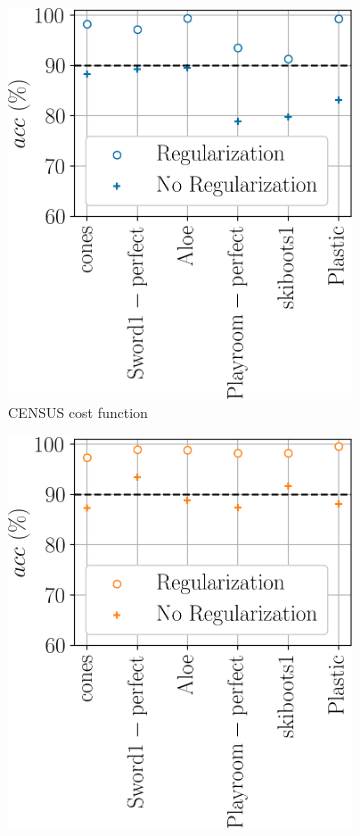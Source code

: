 \begin{figure}
    \begin{subfigure}[t]{0.5\linewidth}
        \flushleft
        \includegraphics[width=\linewidth]{Images/X_Annex/ablation_study_acc_reg_no_reg_CENSUS.png}
        \caption{CENSUS cost function}
        \label{fig:acc_no_reg_CENSUS}
    \end{subfigure}
    \begin{subfigure}[t]{0.5\linewidth}
        \flushright
        \includegraphics[width=\linewidth]{Images/X_Annex/ablation_study_acc_reg_no_reg_MCCNN.png}

\end{subfigure}
\end{figure}
